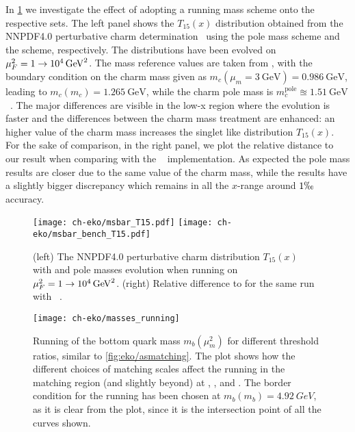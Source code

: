In \cref{fig:eko/MSbarbench} we investigate the effect of adopting a running mass
scheme onto the respective \pdf{} sets. The left panel shows the $T_{15}(x)$
distribution obtained from the NNPDF4.0 perturbative charm
determination~\cite{NNPDF:2021njg} using the pole mass scheme and the \msbar{}
scheme, respectively.
The distributions have been evolved on $\muF^2=\SI[parse-numbers=false]{1\to
10^4}{\GeV^2}$.
The mass reference values are taken from
\cite{LHCHiggsCrossSectionWorkingGroup:2016ypw}, with the \msbar{}
boundary condition on the charm mass given as $m_c(\mu_m=\SI{3}{\GeV}) =
\SI{0.986}{\GeV}$, leading to $m_c(m_c) = \SI{1.265}{\GeV}$, while the charm
pole mass is $m^\text{pole}_{c}\approxeq\SI{1.51}{\GeV}$~\cite{NNPDF:2021njg}.
The major differences are visible in the low-x region where the \dglap{}
evolution is faster and the differences between the charm mass treatment are
enhanced: an higher value of the charm mass increases the singlet like
distribution $T_{15}(x)$.
For the sake of comparison, in the right panel, we plot the relative distance
to our result when comparing with the \apfel{}~\cite{Bertone:2013vaa}
implementation.
As expected the pole mass results are closer due to the same value of the charm
mass, while the \msbar{} results have a slightly bigger discrepancy which
remains in all the $x$-range around $1\permil$ accuracy.

\begin{figure}
    \centering
    \texttt{[image: ch-eko/msbar\_T15.pdf]}
    \texttt{[image: ch-eko/msbar\_bench\_T15.pdf]}
    \caption{(left) The NNPDF4.0 perturbative charm distribution
        $T_{15}(x)$~\cite{NNPDF:2021njg} with \msbar{} and pole masses \nnlo{}
        evolution when running on $\muF^2=\SI[parse-numbers=false]{1\to
        10^4}{\GeV^2}$.  (right) Relative difference to \eko{} for the same run
        with \apfel{}~\cite{Bertone:2013vaa}.}
     \label{fig:eko/MSbarbench}
\end{figure}

\begin{figure}
    \centering
    \texttt{[image: ch-eko/masses\_running]}
    \caption{Running of the bottom quark mass $m_b(\mu_m^2)$ for different threshold
        ratios, similar to \cref{fig:eko/asmatching}.
        The plot shows how the different choices of matching scales affect the
        running in the matching region (and slightly beyond) at \lo{}, \nlo{},
        and \nnlo{}.
        The border condition for the running has been chosen at $m_b(m_b) =
        \SI{4.92}{GeV}$, as it is clear from the plot, since it is the
        intersection point of all the curves shown.}
    \label{fig:eko/runningmasses}
\end{figure}


